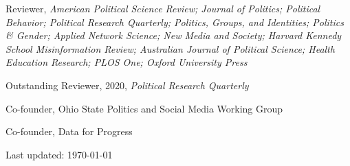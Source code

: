 \documentclass[letterpaper]{article}
\renewenvironment{itemize}{
  \begin{list}{}{
    \setlength{\leftmargin}{1.5em}
  }
}{
  \end{list}
}
\begin{document}
\begin{itemize}
\item Reviewer, \textit{American Political Science Review; Journal of Politics; Political Behavior; Political Research Quarterly; Politics, Groups, and Identities; Politics \& Gender; Applied Network Science; New Media and Society; Harvard Kennedy School Misinformation Review; Australian Journal of Political Science; Health Education Research; PLOS One; Oxford University Press}
\begin{itemize}
Outstanding Reviewer, 2020, \textit{Political Research Quarterly}
\end{itemize}
\item Co-founder, Ohio State Politics and Social Media Working Group
\item Co-founder, Data for Progress
\end{itemize}

\begin{center}
  \begin{footnotesize}
    Last updated: \today
      \end{footnotesize}
\end{center}
\end{document}
